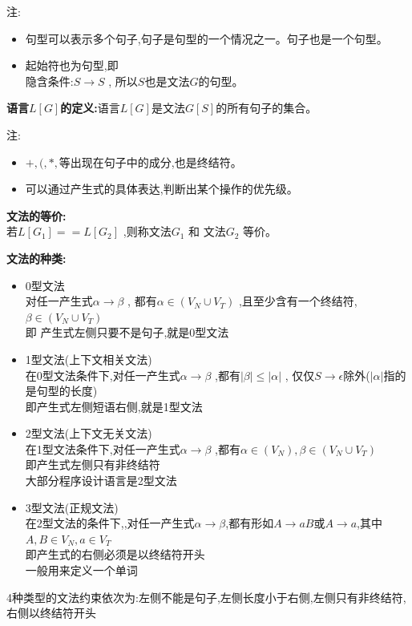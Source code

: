 \documentclass[UTF8,a4paper]{ctexart}
\newcommand{\spaceline}{\vspace{\baselineskip}}
\begin{document}
    注:
    \begin{itemize}
      \item 句型可以表示多个句子,句子是句型的一个情况之一。句子也是一个句型。
      \item 起始符也为句型,即\\
      隐含条件:$S\to S$ , 所以$S$也是文法$G$的句型。
    \end{itemize}

    \spaceline
    \textbf{语言$L[G]$的定义:}语言$L[G]$是文法$G[S]$的所有句子的集合。

    注:
    \begin{itemize}
      \item $+,(,*,$等出现在句子中的成分,也是终结符。
      \item 可以通过产生式的具体表达,判断出某个操作的优先级。
    \end{itemize}

    \spaceline
    \textbf{文法的等价:}\\
    若$L[G_1] == L[G_2]$ ,则称文法$G_1$ 和 文法$G_2$ 等价。

    \spaceline
    \textbf{文法的种类:}
    \begin{itemize}
      \item 0型文法\\
      对任一产生式$\alpha \to \beta$ , 都有$\alpha \in (V_N\cup V_T)$ ,且至少含有一个终结符,$\beta \in (V_N\cup V_T)$\\
      即 产生式左侧只要不是句子,就是0型文法
      \item 1型文法(上下文相关文法)\\
      在0型文法条件下,对任一产生式$\alpha \to \beta$ ,都有$|\beta| \leq |\alpha|$ , 仅仅$S \to \epsilon $除外($|\alpha|$指的是句型的长度)\\
      即产生式左侧短语右侧,就是1型文法
      \item 2型文法(上下文无关文法)\\
      在1型文法条件下,对任一产生式$\alpha \to \beta$ ,都有$\alpha \in (V_N) , \beta \in (V_N\cup V_T)$\\
      即产生式左侧只有非终结符\\
      大部分程序设计语言是2型文法
      \item 3型文法(正规文法)\\
      在2型文法的条件下,,对任一产生式$\alpha \to \beta$,都有形如$A\to aB$或$A \to a$,其中$A,B\in V_N , a \in V_T$\\
      即产生式的右侧必须是以终结符开头\\
      一般用来定义一个单词
    \end{itemize}
    4种类型的文法约束依次为:左侧不能是句子,左侧长度小于右侧,左侧只有非终结符,右侧以终结符开头
\end{document}
